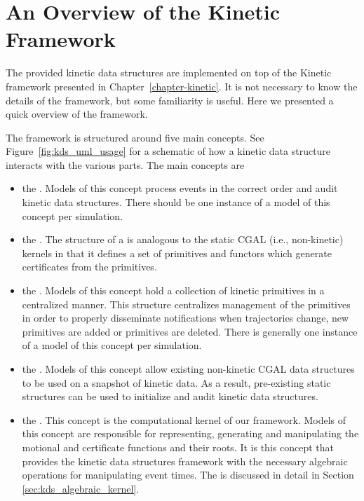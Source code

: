\section{An Overview of the Kinetic Framework\label{sec:kds_overview}}

The provided kinetic data structures are implemented on top of the
Kinetic framework presented in Chapter~\ref{chapter-kinetic}. It is
not necessary to know the details of the framework, but some
familiarity is useful. Here we presented a quick overview of the
framework.

The framework is structured around five main concepts. See
Figure~\ref{fig:kds_uml_usage} for a schematic of how a kinetic data
structure interacts with the various parts. The main concepts are
 


\begin{itemize}

\item the . Models of this concept process events in
  the correct order and audit kinetic data structures. There should be
  one instance of a model of this concept per simulation.
\item the . The structure of a
   is analogous to the static CGAL (i.e.,
  non-kinetic) kernels in that it defines a set of primitives and
  functors which generate certificates from the primitives.
\item the . Models of this concept hold a
  collection of kinetic primitives in a centralized manner. This
  structure centralizes management of the primitives in order to
  properly disseminate notifications when trajectories change, new
  primitives are added or primitives are deleted.
  There is generally one instance of a model of this concept per simulation.
\item the . Models of this concept allow
  existing non-kinetic CGAL data structures to be used on a snapshot
  of kinetic data. As a result, pre-existing static structures can be
  used to initialize and audit kinetic data structures.
\item the . This concept is the computational
  kernel of our framework.  Models of this concept are responsible for
  representing, generating and manipulating the motional and
  certificate functions and their roots. It is this concept that
  provides the kinetic data structures framework with the necessary
  algebraic operations for manipulating event times. The
   is discussed in detail in Section
  \ref{sec:kds_algebraic_kernel}.
\end{itemize}

